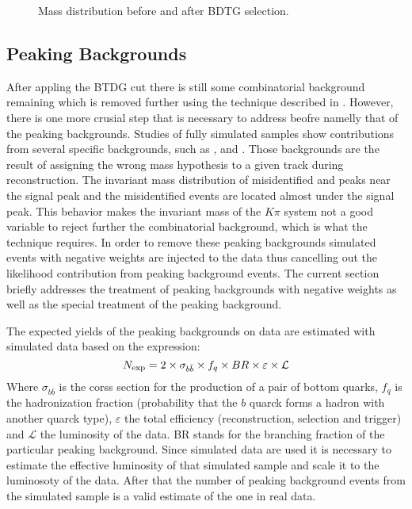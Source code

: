 \begin{figure}[h]
\begin{center}
\caption{Mass distribution before and after BDTG selection.}
\label{mass_BDTG_selection}
\end{center}
\end{figure}

\subsection{Peaking Backgrounds}
\label{peaking_backgrounds}

After appling the BTDG cut there is still some combinatorial background remaining which is removed
further using the \sPlot technique described in . However, there is
one more crusial step that is necessary to address beofre namelly that of the peaking backgrounds.
Studies of fully simulated samples show contributions from several specific backgrounds, such as \BsJpsiKK, \BsJpsipipi and \BdJpsipipi.
Those backgrounds are the result of assigning the wrong mass hypothesis to a given track during reconstruction.  
The invariant mass distribution of misidentified \BdJpsipipi and \BsJpsipipi peaks near the \BsJpsiKpi signal peak
and the misidentified \BsJpsiKK events are located almost under the \BdJpsiKpi signal peak. 
This behavior makes the invariant mass of the \Jpsi$K\pi$ system not a good variable to reject further the combinatorial background,
which is what the \sPlot technique requires. In order to remove these peaking backgrounds simulated events with negative weights are
injected to the data thus cancelling out the likelihood contribution from peaking background events. The current section briefly addresses
the treatment of peaking backgrounds with negative weights as well as the special treatment of the \LbJpsippi peaking background.

The expected yields of the peaking backgrounds on data are estimated with simulated data based on the expression:
\begin{equation}
N_{\rm exp} = 2 \times \sigma_{b\bar{b}}\times f_q \times BR \times \varepsilon \times {\mathcal{L}}
\end{equation}
\noindent Where $\sigma_{b\bar{b}}$ is the corss section for the production of a pair of bottom quarks, $f_q$ is the hadronization fraction
(probability that the $b$ quarck forms a hadron with another quarck type), $\varepsilon$ the total efficiency (reconstruction, selection and trigger)
and ${\mathcal{L}}$ the luminosity of the data. BR stands for the branching fraction of the particular peaking background. Since simulated data are used
it is necessary to estimate the effective luminosity of that simulated sample and scale it to the luminosoty of the data. After that the number of
peaking background events from the simulated sample is a valid estimate of the one in real data.

